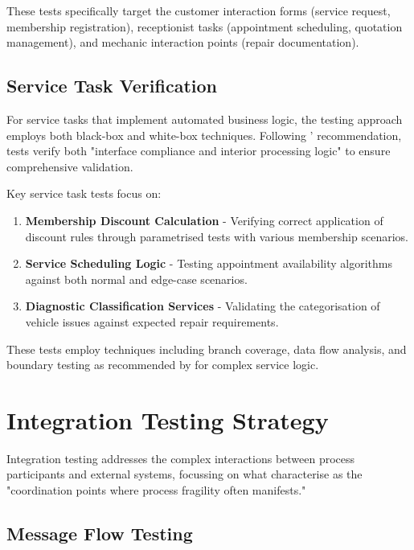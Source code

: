 \documentclass[14pt,a4paper]{article}
\begin{document}
These tests specifically target the customer interaction forms (service request, membership registration), receptionist tasks (appointment scheduling, quotation management), and mechanic interaction points (repair documentation).

\subsection{Service Task Verification}

For service tasks that implement automated business logic, the testing approach employs both black-box and white-box techniques. Following \textit{\parencite[p. 53]{Garcia-Borgonon2017}}' recommendation, tests verify both "interface compliance and interior processing logic" to ensure comprehensive validation.

Key service task tests focus on:

\begin{enumerate}
    \item \textbf{Membership Discount Calculation} - Verifying correct application of discount rules through parametrised tests with various membership scenarios.

    \item \textbf{Service Scheduling Logic} - Testing appointment availability algorithms against both normal and edge-case scenarios.

    \item \textbf{Diagnostic Classification Services} - Validating the categorisation of vehicle issues against expected repair requirements.
\end{enumerate}

These tests employ techniques including branch coverage, data flow analysis, and boundary testing as recommended by \textit{\parencite[p. 168]{Weber2016}} for complex service logic.

\section{Integration Testing Strategy}

Integration testing addresses the complex interactions between process participants and external systems, focussing on what \textit{\parencite[p. 219]{Dustdar2016}} characterise as the "coordination points where process fragility often manifests."

\subsection{Message Flow Testing}
\end{document}
